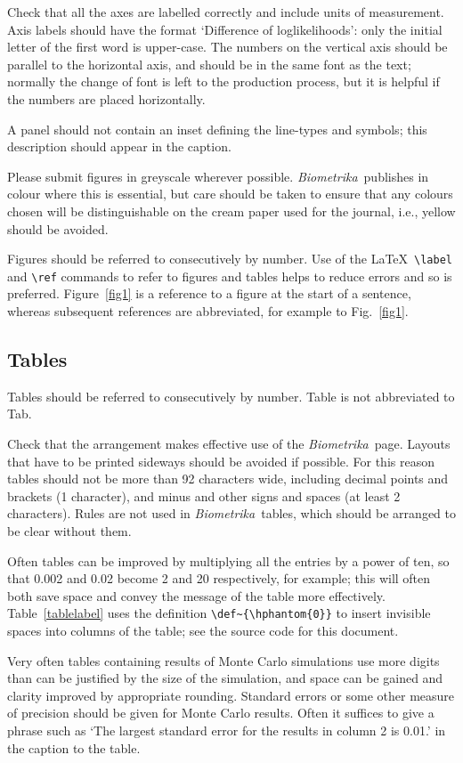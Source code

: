 \documentclass[article,lineno]{biometrika}
\def\Bka{{\it Biometrika}}
\begin{document}
Check that all the axes are labelled correctly and include units of measurement.  Axis labels should have the format `Difference of loglikelihoods': only the initial letter of the first word is upper-case.
The numbers on the vertical axis should be parallel to the horizontal axis, and should be in the same font as the text; normally the change of font is left to the production process, but it is helpful if the numbers are placed horizontally.

A panel should not contain an inset defining the line-types and symbols; this description should appear in the caption.

Please submit figures in greyscale wherever possible.  \Bka\ publishes in colour where this is essential, but care should be taken to ensure that any colours chosen will be distinguishable on the cream paper used for the journal, i.e., yellow should be avoided.

Figures should be referred to consecutively by number. Use of the \LaTeX\ \verb+\label+ and \verb+\ref+ commands to refer to figures and tables helps to reduce errors and so is preferred.  Figure~\ref{fig1}  is a reference to a figure at the start of a sentence, whereas subsequent references are abbreviated, for example to Fig.~\ref{fig1}.


\subsection{Tables}

Tables should be referred to consecutively by number. Table is not abbreviated to Tab.

Check that the arrangement makes effective use
of the \Bka\ page. Layouts that have to be printed sideways should be avoided
if possible. For this reason tables should not be more than 92 characters wide, including
decimal points and brackets (1 character), and minus and other signs and spaces (at least 2
characters).  Rules are not used in \Bka\ tables, which should be arranged to be clear without them.

Often tables can be improved by multiplying all the entries by a power of ten, so that 0.002 and
0.02 become 2 and 20 respectively, for example; this will often both save space and convey the message of the table more effectively. Table~\ref{tablelabel} uses the definition \verb+\def~{\hphantom{0}}+ to insert invisible spaces into columns of the table; see the source code for this document.

Very often tables containing results of Monte Carlo simulations use more digits than can be justified by the size of the simulation, and space can be gained and clarity improved by appropriate rounding.
Standard errors or some other measure of precision should be given for Monte Carlo results.
Often it suffices to give a phrase such as `The largest standard error for the results in column 2 is 0.01.' in the caption to the table.
\end{document}

